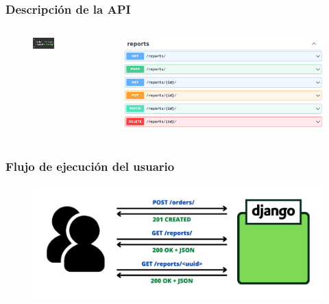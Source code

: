 \documentclass[
	11pt, %
	aspectratio=169, %
]{beamer}
\begin{document}

\begin{frame}
	\frametitle{Descripción de la API}

	\begin{columns}[c] %
		\begin{column}{0.4\textwidth} %
			\begin{figure}
				\includegraphics[width=0.7\linewidth]{report_model.png}
			\end{figure}
		\end{column}
		\begin{column}{0.6\textwidth} %
			\begin{figure}
				\includegraphics[width=\linewidth]{grimoirebots_api_reports.png}
			\end{figure}
		\end{column}
	\end{columns}
\end{frame}


\begin{frame}
	\frametitle{Flujo de ejecución del usuario}

	\begin{figure}
		\includegraphics[width=0.8\linewidth]{grimoirebots_frontend.pdf}
	\end{figure}
\end{frame}
\end{document}
